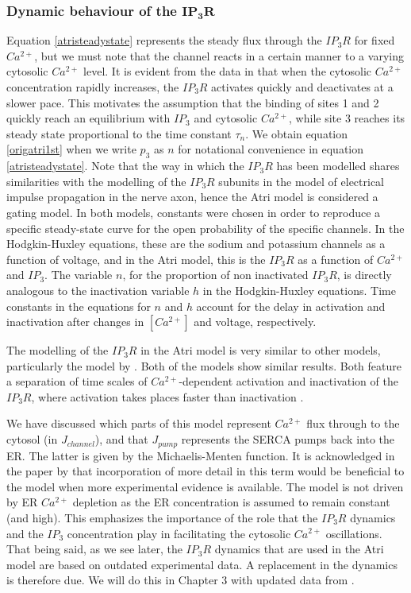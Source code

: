 \subsubsection*{Dynamic behaviour of the $\mathbf{IP_3R}$}
Equation \eqref{atristeadystate} represents the steady flux through the $IP_3R$ for fixed $Ca^{2+}$, but we must note that the channel reacts in a certain manner to a varying cytosolic $Ca^{2+}$ level. It is evident from the data in  that when the cytosolic $Ca^{2+}$ concentration rapidly increases, the $IP_3R$ activates quickly and deactivates at a slower pace. This motivates the assumption that the binding of sites 1 and 2 quickly reach an equilibrium with $IP_3$ and cytosolic $Ca^{2+}$, while site 3 reaches its steady state proportional to the time constant $\tau_n$. We obtain equation \eqref{origatri1st} when we write $p_3$ as $n$ for notational convenience in equation \eqref{atristeadystate}. Note that the way in which the $IP_3R$ has been modelled shares similarities with the modelling of the $IP_3R$ subunits in the  model of electrical impulse propagation in the nerve axon, hence the Atri model is considered a gating model.  {In both models, constants were chosen in order to reproduce a specific steady-state curve for the open probability of the specific channels. In the Hodgkin-Huxley equations, these are the sodium and potassium channels as a function of voltage, and in the Atri model, this is the $IP_3R$ as a function of $Ca^{2+}$ and $IP_3$. The variable $n$, for the proportion of non inactivated $IP_3R$,
is directly analogous to the inactivation variable $h$ in the
Hodgkin-Huxley equations. Time constants in the equations for $n$ and $h$ account for the delay in activation and inactivation after changes in $[Ca^{2+}]$ and voltage, respectively.}

The modelling of the $IP_3R$ in the Atri model is very similar to other models, particularly the model by . Both of the models show similar results. Both feature a separation of time scales of $Ca^{2+}$-dependent activation and inactivation of the $IP_3R$, where activation takes places faster than inactivation \cite{finchetal}.

We have discussed which parts of this model represent $Ca^{2+}$ flux through to the cytosol (in $J_{channel}$), and that $J_{pump}$ represents the SERCA pumps back into the ER. The latter is given by the {Michaelis-Menten function}. It is acknowledged in the paper by  that incorporation of more detail in this term would be beneficial to the model when more experimental evidence is available. The model is not driven by ER $Ca^{2+}$ depletion as the ER concentration is assumed to remain constant (and high). This emphasizes the importance of the role that the $IP_3R$ dynamics and the $IP_3$ concentration play in  facilitating the cytosolic $Ca^{2+}$ oscillations. That being said, as we see later, the $IP_3R$ dynamics that are used in the Atri model are based on outdated experimental data. A replacement in the dynamics is therefore due. We will do this in Chapter 3 with updated data from .

